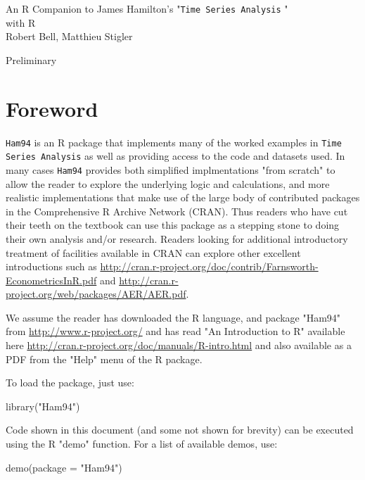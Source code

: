\documentclass[a4paper]{article}
\newcommand{\RcH}{\texttt{Ham94} }
\newcommand{\TSA}{\texttt{Time Series Analysis} }
\begin{document}
\begin{titlepage}
{\centering \huge An R Companion to James Hamilton's "\TSA" \\[0.5cm]
with R\\[0.5cm]
\small Robert Bell, Matthieu Stigler\\}
\vfill\par
{\centering Preliminary\\}
\end{titlepage}

\section*{Foreword} \RcH is an R package that implements many of the worked examples in \TSA
as well as providing access to the code and datasets used.  In many cases \RcH provides both
simplified implmentations "from scratch" to allow the reader to explore the underlying logic and
calculations, and more realistic implementations that make use of the large body
of contributed packages in the Comprehensive R Archive Network (CRAN).  Thus readers who have
cut their teeth on the textbook can use this package as a stepping stone to doing their own
analysis and/or research.  Readers looking for additional introductory treatment of facilities 
available in CRAN can explore other excellent introductions such as \url{http://cran.r-project.org/doc/contrib/Farnsworth-EconometricsInR.pdf}
and \url{http://cran.r-project.org/web/packages/AER/AER.pdf}.

We assume the reader has downloaded the R language, and package "Ham94" from \url{http://www.r-project.org/}
and has read "An Introduction to R" available here \url{http://cran.r-project.org/doc/manuals/R-intro.html}
and also available as a PDF from the "Help" menu of the R package.

To load the package, just use:

\begin{Schunk}
\begin{Sinput}
 library("Ham94")
\end{Sinput}
\end{Schunk}

Code shown in this document (and some not shown for brevity) can be executed using the R "demo" function.  For a list of
available demos, use:

\begin{Schunk}
\begin{Sinput}
 demo(package = "Ham94")
\end{Sinput}
\end{Schunk}
\end{document}
